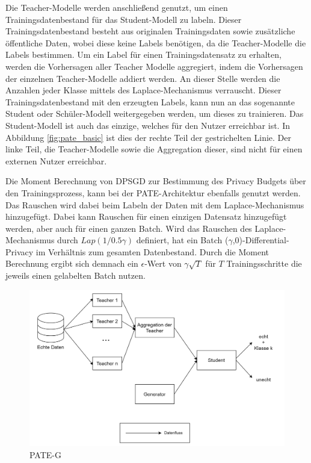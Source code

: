 Die Teacher-Modelle werden anschließend genutzt, um einen Trainingsdatenbestand für das Student-Modell zu labeln.
Dieser Trainingsdatenbestand besteht aus originalen Trainingsdaten sowie zusätzliche öffentliche Daten, wobei diese keine Labels benötigen, da die Teacher-Modelle die Labels bestimmen.
Um ein Label für einen Trainingsdatensatz zu erhalten, werden die Vorhersagen aller Teacher Modelle aggregiert, indem die Vorhersagen der einzelnen Teacher-Modelle addiert werden. 
An dieser Stelle werden die Anzahlen jeder Klasse mittels des Laplace-Mechanismus verrauscht.
Dieser Trainingsdatenbestand mit den erzeugten Labels, kann nun an das sogenannte Student oder Schüler-Modell weitergegeben werden, um dieses zu trainieren.
Das Student-Modell ist auch das einzige, welches für den Nutzer erreichbar ist.
In Abbildung \ref{fig:pate_basic} ist dies der rechte Teil der gestrichelten Linie.
Der linke Teil, die Teacher-Modelle sowie die Aggregation dieser, sind nicht für einen externen Nutzer erreichbar.

Die Moment Berechnung von DPSGD \cite{P-28} zur Bestimmung des Privacy Budgets über den Trainingsprozess, kann bei der PATE-Architektur ebenfalls genutzt werden.
Das Rauschen wird dabei beim Labeln der Daten mit dem Laplace-Mechanismus hinzugefügt.
Dabei kann Rauschen für einen einzigen Datensatz hinzugefügt werden, aber auch für einen ganzen Batch.
Wird das Rauschen des Laplace-Mechanismus durch $Lap(1/ 0.5\gamma)$ definiert, hat ein Batch ($\gamma$,0)-Differential-Privacy im Verhältnis zum gesamten Datenbestand.
Durch die Moment Berechnung ergibt sich demnach ein $\epsilon$-Wert von  $\gamma\sqrt{T}$ für $T$ Trainingsschritte die jeweils einen gelabelten Batch nutzen.

\begin{figure}[!htb]
    \centering
    \includegraphics[width=15cm]{figures/pate_g.png}
    \caption{PATE-G}
    \label{fig:pate_g}
\end{figure} 

